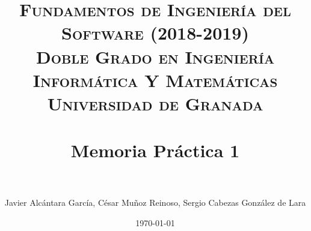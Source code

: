 



\title{	
\normalfont \normalsize 
\textsc{\textbf{Fundamentos de Ingeniería del Software (2018-2019)} \\ Doble Grado en Ingeniería Informática Y Matemáticas \\ Universidad de Granada} \\ [25pt] %
\horrule{0.5pt} \\[0.4cm] %
\huge Memoria Práctica 1 \\ %
\horrule{2pt} \\[0.5cm] %
}

\author{Javier Alcántara García, César Muñoz Reinoso, Sergio Cabezas González de Lara} %

\date{\normalsize\today} %





\maketitle %

\newpage %

\tableofcontents %

\listoffigures

\listoftables

\newpage


